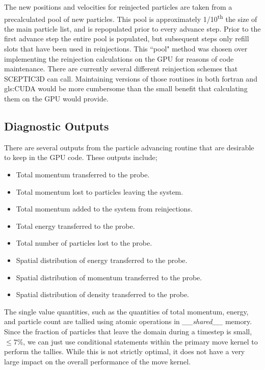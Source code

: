 The new positions and velocities for reinjected particles are taken from a precalculated pool of new particles. This pool is approximately 1/10\textsuperscript{th} the size of the main particle list, and is repopulated prior to every advance step. Prior to the first advance step the entire pool is populated, but subsequent steps only refill slots that have been used in reinjections. This ``pool" method was chosen over implementing the reinjection calculations on the GPU for reasons of code maintenance. There are currently several different reinjection schemes that SCEPTIC3D can call. Maintaining versions of those routines in both fortran and \gls{gls:CUDA} would be more cumbersome than the small benefit that calculating them on the GPU would provide. 

		\subsection{Diagnostic Outputs}
		\label{sec:diagnostic_outputs}
	There are several outputs from the particle advancing routine that are desirable to keep in the GPU code. These outputs include;


\begin{itemize}
\singlespacing
\item Total momentum transferred to the probe.
\item Total momentum lost to particles leaving the system.
\item Total momentum added to the system from reinjections.
\item Total energy transferred to the probe. 
\item Total number of particles lost to the probe. 
\item Spatial distribution of energy transferred to the probe. 
\item Spatial distribution of momentum transferred to the probe. 
\item Spatial distribution of density transferred to the probe. 
\end{itemize}


	The single value quantities, such as the quantities of total momentum, energy, and particle count are tallied using atomic operations in \emph{\_\_shared\_\_} memory. Since the fraction of particles that leave the domain during a timestep is small, $\leq 7\%$, we can just use conditional statements within the primary move kernel to perform the tallies. While this is not strictly optimal, it does not have a very large impact on the overall performance of the move kernel. 






